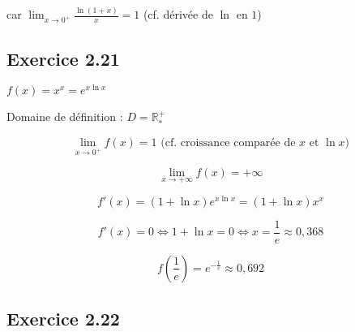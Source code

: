 \documentclass[a4paper,10pt]{report}
\begin{document}
car $\lim_{x \rightarrow 0^{+}} \frac{\ln(1+x)}{x} = 1$ (cf. dérivée de $\ln$ en $1$)

\subsection*{Exercice 2.21}

$f(x) = x^x = e^{x \ln x}$

Domaine de définition : $D = \mathbb{R}^+_*$

\begin{displaymath}
	\lim_{x \rightarrow 0^{+}} f(x) = 1  \text{ (cf. croissance comparée de $x$ et $\ln x$)}
\end{displaymath}

\begin{displaymath}
	\lim_{x \rightarrow +\infty} f(x) = +\infty
\end{displaymath}

\begin{displaymath}
	f'(x) = (1+ \ln x)e^{x \ln x} = (1+ \ln x)x^x
\end{displaymath}

\begin{displaymath}
	f'(x) = 0 \Longleftrightarrow 1 + \ln x = 0 \Longleftrightarrow x = \frac{1}{e} \approx 0,368
\end{displaymath}

\begin{displaymath}
	f\left(\frac{1}{e}\right) = e^{-\frac{1}{e}} \approx 0,692
\end{displaymath}



\subsection*{Exercice 2.22}
\end{document}
